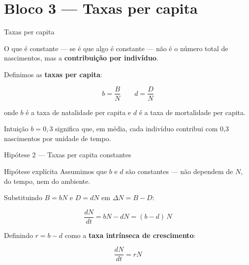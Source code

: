 \documentclass[12pt]{beamer}
\begin{document}
\section{Bloco 3 — Taxas per capita}

\begin{frame}{Taxas per capita}

  O que é constante --- se é que algo é constante --- não é
  o número total de nascimentos, mas a \textbf{contribuição por indivíduo}.

  \bigskip
  Definimos as \textbf{taxas per capita}:

  \[
    b = \frac{B}{N} \qquad d = \frac{D}{N}
  \]

  onde $b$ é a taxa de natalidade per capita e
  $d$ é a taxa de mortalidade per capita.

  \bigskip
  \begin{block}{Intuição}
    $b = 0{,}3$ significa que, em média, cada indivíduo
    contribui com 0,3 nascimentos por unidade de tempo.
  \end{block}

\end{frame}

\begin{frame}{Hipótese 2 — Taxas per capita constantes}

  \begin{exampleblock}{Hipótese explícita}
    Assumimos que $b$ e $d$ são constantes ---
    não dependem de $N$, do tempo, nem do ambiente.
  \end{exampleblock}

  \bigskip
  Substituindo $B = bN$ e $D = dN$ em $\Delta N = B - D$:

  \[
    \frac{dN}{dt} = bN - dN = (b - d)\,N
  \]

  \bigskip
  Definindo $r = b - d$ como a \textbf{taxa intrínseca de crescimento}:

  \[
    \boxed{\frac{dN}{dt} = rN}
  \]

\end{frame}
\end{document}

